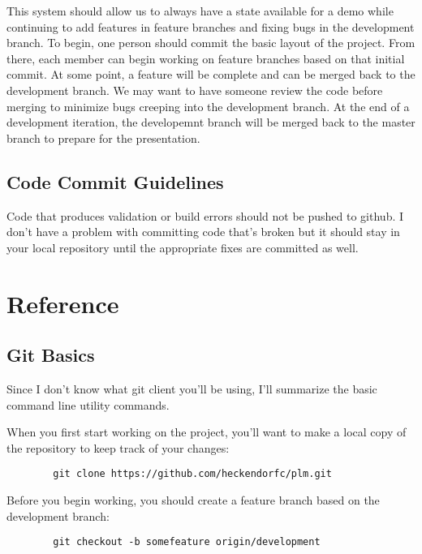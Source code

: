 \documentclass{article}
\begin{document}
	This system should allow us to always have a state available for a demo while continuing to add features in feature branches and fixing bugs in the development branch. To begin, one person should commit the basic layout of the project. From there, each member can begin working on feature branches based on that initial commit. At some point, a feature will be complete and can be merged back to the development branch. We may want to have someone review the code before merging to minimize bugs creeping into the development branch. At the end of a development iteration, the developemnt branch will be merged back to the master branch to prepare for the presentation.

	\subsection {Code Commit Guidelines}

	Code that produces validation or build errors should not be pushed to github. I don't have a problem with committing code that's broken but it should stay in your local repository until the appropriate fixes are committed as well.

	\section{Reference}

	\subsection{Git Basics}

	Since I don't know what git client you'll be using, I'll summarize the basic command line utility commands.

	When you first start working on the project, you'll want to make a local copy of the repository to keep track of your changes:

	\begin{minipage}{0.95\textwidth}\begin{lstlisting}
	    git clone https://github.com/heckendorfc/plm.git
	\end{lstlisting}\end{minipage}

	Before you begin working, you should create a feature branch based on the development branch:

	\begin{minipage}{0.95\textwidth}\begin{lstlisting}
	    git checkout -b somefeature origin/development
	\end{lstlisting}\end{minipage}
\end{document}

